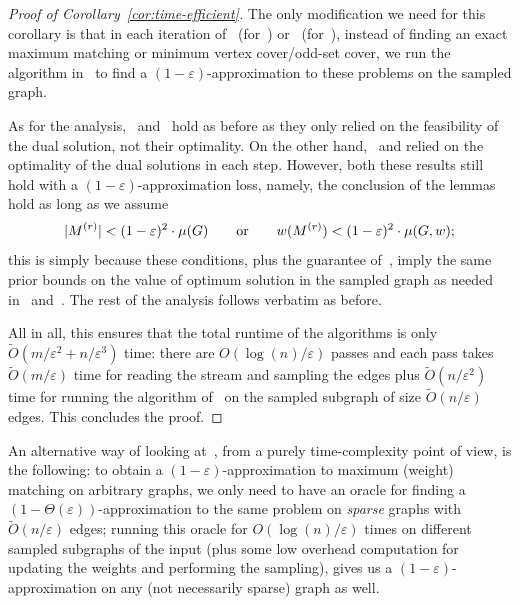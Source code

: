 \documentclass{article}
\DeclarePairedDelimiter{\card}{\vert}{\vert}
\newcommand{\Ot}{\widetilde{O}}
\newcommand{\eps}{\varepsilon}
\begin{document}
\begin{proof}[Proof of Corollary~\ref{cor:time-efficient}]
	The only modification we need for this corollary is that in each iteration of~ (for~) or~ (for~), instead of finding an exact maximum matching or minimum vertex cover/odd-set cover, 
	we run the algorithm in~ to find a $(1-\eps)$-approximation to these problems on the sampled graph. 
	
	As for the analysis,~ and~ hold as before as they only relied on the feasibility of the dual solution, not their optimality. On the other hand,~ and
	 relied on the optimality of the dual solutions in each step. However, both these results still hold with a $(1-\eps)$-approximation loss, namely, the conclusion of the lemmas hold as long as we assume
	\[
		\card{{M^{(r)}}} < (1-\eps)^2 \cdot \mu(G) \qquad \text{or} \qquad w({M^{(r)}}) < (1-\eps)^2 \cdot \mu(G,w);
	\]
	this is simply because these conditions, plus the guarantee of~, imply the same prior bounds on the value of optimum solution in the sampled graph as needed in~ and~. 
	The rest of the analysis follows verbatim as before. 
	
	All in all, this ensures that the total runtime of the algorithms is only $\Ot(m/\eps^2 + n/\eps^3)$ time: there are $O(\log{(n)}/\eps)$ passes 
	and each pass takes $\Ot(m/\eps)$ time for reading the stream and sampling the edges plus $\Ot(n/\eps^2)$ time for running the algorithm of~\cite{DuanP14} on the sampled subgraph of size $\Ot(n/\eps)$ edges. This concludes the proof. 
\end{proof}

An alternative way of looking at~, from a purely time-complexity point of view, is the following: to obtain a $(1-\eps)$-approximation to maximum (weight) matching on arbitrary graphs, 
we only need to have an oracle for finding a $(1-\Theta(\eps))$-approximation to the same problem on \emph{sparse} graphs with $\Ot(n/\eps)$ edges; running this oracle for $O(\log{(n)}/\eps)$ times on different sampled subgraphs of the input (plus some
low overhead computation for updating the weights and performing the sampling), gives us a $(1-\eps)$-approximation on any (not necessarily sparse) graph as well. 
\end{document}
